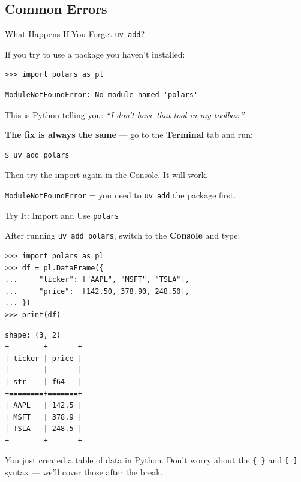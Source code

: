 \documentclass[9pt,aspectratio=169]{beamer}
\begin{document}
\subsection{Common Errors}
\begin{frame}[fragile]{What Happens If You Forget \texttt{uv add}?}

If you try to use a package you haven't installed:

\begin{lstlisting}
>>> import polars as pl
\end{lstlisting}

\begin{lstlisting}[style=output]
ModuleNotFoundError: No module named 'polars'
\end{lstlisting}

\medskip

This is Python telling you: \textit{``I don't have that tool in my toolbox.''}

\bigskip

\textbf{The fix is always the same} --- go to the \textbf{Terminal} tab and run:

\begin{lstlisting}[style=shell]
$ uv add polars
\end{lstlisting}

Then try the import again in the Console. It will work.

\bigskip

\begin{highlightbox}
\centering
\texttt{ModuleNotFoundError} = you need to \texttt{uv add} the package first.
\end{highlightbox}

\end{frame}


\begin{frame}[fragile]{Try It: Import and Use \texttt{polars}}

After running \texttt{uv add polars}, switch to the \textbf{Console} and type:

\begin{lstlisting}
>>> import polars as pl
>>> df = pl.DataFrame({
...     "ticker": ["AAPL", "MSFT", "TSLA"],
...     "price":  [142.50, 378.90, 248.50],
... })
>>> print(df)
\end{lstlisting}

\begin{lstlisting}[style=output]
shape: (3, 2)
+--------+-------+
| ticker | price |
| ---    | ---   |
| str    | f64   |
+========+=======+
| AAPL   | 142.5 |
| MSFT   | 378.9 |
| TSLA   | 248.5 |
+--------+-------+
\end{lstlisting}

You just created a table of data in Python. Don't worry about the \texttt{\{~\}} and \texttt{[~]} syntax --- we'll cover those after the break.

\end{frame}
\end{document}

